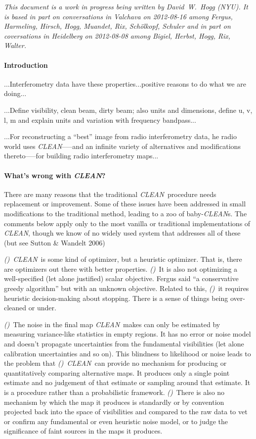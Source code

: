 \documentclass[12pt]{article}
\newcounter{hogg}
\newcommand{\hoggitem}{\textsl{(\thehogg)}\stepcounter{hogg}}
\newcommand{\project}[1]{\textsl{#1}}
\newcommand{\CLEAN}{\project{CLEAN}}
\begin{document}
\sloppy\sloppypar

\textsl{This document is a work in progress being written by
  David~W.~Hogg (NYU).  It is based in part on conversations in
  Valchava on 2012-08-16 among Fergus, Harmeling, Hirsch, Hogg,
  Muandet, Rix, Sch\"olkopf, Schuler and in part on coversations in
  Heidelberg on 2012-08-08 among Bigiel, Herbst, Hogg, Rix, Walter.}

\paragraph{Introduction}

...Interferometry data have these properties...positive reasons to do
what we are doing...

...Define visibility, clean beam, dirty beam; also units and
dimensions, define u, v, l, m and explain units and variation with
frequency bandpass...

...For reconstructing a ``best'' image from radio interferometry data,
he radio world uses \CLEAN--—and an infinite variety of alternatives
and modifications thereto—--for building radio interferometry maps...

\paragraph{What's wrong with \CLEAN?}

There are many reasons that the traditional \CLEAN\ procedure needs
replacement or improvement.  Some of these issues have been addressed
in small modifications to the traditional method, leading to a zoo of
baby-\CLEAN s.  The comments below apply only to the most vanilla or
traditional implementations of \CLEAN, though we know of no widely
used system that addresses all of these (but see Sutton \& Wandelt
2006)

\hoggitem~\CLEAN\ is some kind of optimizer, but a heuristic
optimizer.  That is, there are optimizers out there with better
properties.  \hoggitem~It is also not optimizing a well-specified (let
alone justified) scalar objective.  Fergus said ``a conservative
greedy algorithm'' but with an unknown objective.  Related to this,
\hoggitem~it requires heuristic decision-making about stopping.  There
is a sense of things being over-cleaned or under.

\hoggitem~The noise in the final map \CLEAN\ makes can only be
estimated by measuring variance-like statistics in empty regions.  It
has no error or noise model and doesn't propagate uncertainties from
the fundamental visibilities (let alone calibration uncertainties and
so on).  This blindness to likelihood or noise leads to the problem
that \hoggitem~\CLEAN\ can provide no mechanism for producing or
quantitatively comparing alternative maps.  It produces only a single
point estimate and no judgement of that estimate or sampling around
that estimate.  It is a procedure rather than a probabilistic
framework.  \hoggitem~There is also no mechanism by which the map it
produces is standardly or by convention projected back into the space
of visibilities and compared to the raw data to vet or confirm any
fundamental or even heuristic noise model, or to judge the
significance of faint sources in the maps it produces.
\end{document}
